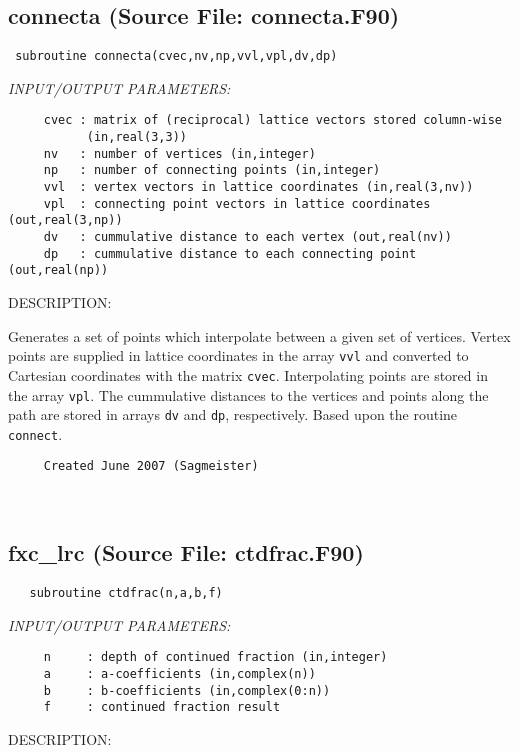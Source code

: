 \documentclass[11pt]{article}
\begin{document}
\subsection{connecta (Source File: connecta.F90)}


\begin{verbatim} subroutine connecta(cvec,nv,np,vvl,vpl,dv,dp)\end{verbatim}{\em INPUT/OUTPUT PARAMETERS:}
\begin{verbatim}     cvec : matrix of (reciprocal) lattice vectors stored column-wise
           (in,real(3,3))
     nv   : number of vertices (in,integer)
     np   : number of connecting points (in,integer)
     vvl  : vertex vectors in lattice coordinates (in,real(3,nv))
     vpl  : connecting point vectors in lattice coordinates (out,real(3,np))
     dv   : cummulative distance to each vertex (out,real(nv))
     dp   : cummulative distance to each connecting point (out,real(np))\end{verbatim}
{\sf DESCRIPTION:\\ }


     Generates a set of points which interpolate between a given set of vertices.
     Vertex points are supplied in lattice coordinates in the array {\tt vvl} and
     converted to Cartesian coordinates with the matrix {\tt cvec}. Interpolating
     points are stored in the array {\tt vpl}. The cummulative distances to the
     vertices and points along the path are stored in arrays {\tt dv} and
     {\tt dp}, respectively. Based upon the routine {\tt connect}.
  
\begin{verbatim}     Created June 2007 (Sagmeister)\end{verbatim}




 
 
\mbox{}\hrulefill\ 
 
\subsection{fxc\_lrc (Source File: ctdfrac.F90)}


\begin{verbatim}   subroutine ctdfrac(n,a,b,f)\end{verbatim}{\em INPUT/OUTPUT PARAMETERS:}
\begin{verbatim}     n     : depth of continued fraction (in,integer)
     a     : a-coefficients (in,complex(n))
     b     : b-coefficients (in,complex(0:n))
     f     : continued fraction result\end{verbatim}
{\sf DESCRIPTION:\\ }
\end{document}
